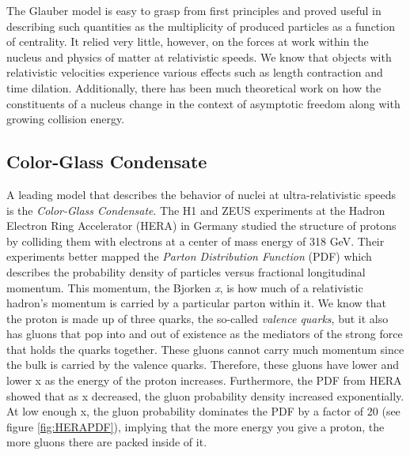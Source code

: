 The Glauber model is easy to grasp from first principles and proved useful in describing such quantities as the multiplicity of produced particles as a function of centrality. It relied very little, however, on the forces at work within the nucleus and physics of matter at relativistic speeds. We know that objects with relativistic velocities experience various effects such as length contraction and time dilation. Additionally, there has been much theoretical work on how the constituents of a nucleus change in the context of asymptotic freedom along with growing collision energy\citep{PhysRevD.10.1649}.

\subsection{Color-Glass Condensate}
A leading model that describes the behavior of nuclei at ultra-relativistic speeds is the \textit{Color-Glass Condensate}. The H1 and ZEUS experiments at the Hadron Electron Ring Accelerator (HERA) in Germany studied the structure of protons by colliding them with electrons at a center of mass energy of 318 GeV\citep{Abramowicz2015}. Their experiments better mapped the \textit{Parton Distribution Function} (PDF) which describes the probability density of particles versus fractional longitudinal momentum. This momentum, the Bjorken \textit{x}, is how much of a relativistic hadron's momentum is carried by a particular parton within it. We know that the proton is made up of three quarks, the so-called \textit{valence quarks}, but it also has gluons that pop into and out of existence as the mediators of the strong force that holds the quarks together. These gluons cannot carry much momentum since the bulk is carried by the valence quarks. Therefore, these gluons have lower and lower x as the energy of the proton increases. Furthermore, the PDF from HERA showed that as x decreased, the gluon probability density increased exponentially. At low enough x, the gluon probability dominates the PDF by a factor of 20 (see figure \ref{fig:HERAPDF}), implying that the more energy you give a proton, the more gluons there are packed inside of it.

